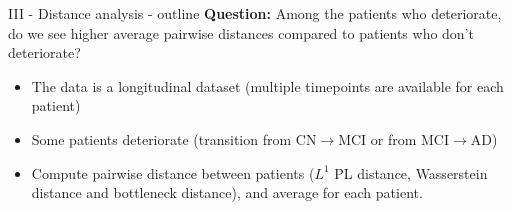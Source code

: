 \documentclass[aspectratio=169, 10pt, dvipsnames]{beamer}
\begin{document}
\begin{frame}[fragile]{III - Distance analysis - outline}
\textbf{Question:} Among the patients who deteriorate, do we see higher average pairwise distances compared to patients who don't deteriorate?
  \begin{itemize}
  \item The data is a longitudinal dataset (multiple timepoints are available for each patient)
  \item Some patients deteriorate (transition from CN$\rightarrow$MCI or from MCI$\rightarrow$AD)
  \item Compute pairwise distance between patients ($L^1$ PL distance, Wasserstein distance and bottleneck distance), and average for each patient.
  \end{itemize}
\end{frame}
\end{document}
